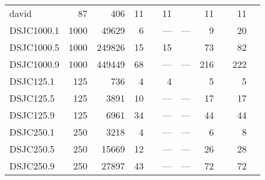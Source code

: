 \begin{table}[t]
\begin{tabular}{lrrrlrlrlrl}
  david & 87 & 406 & 11 & \cite{Malaguti2011} & 11 & \cite{Gualandi2012} & 11 & \cite{Mehrotra1996,Mehrotra1996,Malaguti2011,Gualandi2012,Mendez-Diaz2006} & 11 & \cite{Mehrotra1996,Mehrotra1996,Malaguti2011,Wu2013a,Gualandi2012,Mendez-Diaz2006,Brelaz1979,Sewell1996,Segundo2012} \\ 
  DSJC1000.1 & 1000 & 49629 & 6 & \cite{Held2011} & --- & --- & 9 & \cite{Held2011} & 20 & \cite{Galinier1999,BlochligerI.andZufferey2004,Hertz2008,Malaguti2008,Porumbel2010,Malaguti2011,Zhou2018,Galinier1999,Lu2010,Porumbel2010,Lu2010,Titiloye2011,Moalic2015,Wu2013a,Wu2012,Wu2013} \\ 
  DSJC1000.5 & 1000 & 249826 & 15 & \cite{Tomita2017} & 15 & \cite{Tomita2017} & 73 & \cite{Held2011} & 82 & \cite{Moalic2015} \\ 
  DSJC1000.9 & 1000 & 449449 & 68 & \cite{us} & --- & --- & 216 & \cite{Held2011} & 222 & \cite{Moalic2015,Titiloye2011,Wu2012} \\ 
  DSJC125.1 & 125 & 736 & 4 & \cite{Gualandi2012} & 4 & \cite{Gualandi2012} & 5 & \cite{Mendez-Diaz2006,Mendez-Diaz2006,Mendez-Diaz2008,Malaguti2011,Gualandi2012} & 5 & \cite{Zhou2016,Mendez-Diaz2006,Mendez-Diaz2006,Morgenstern1996,FunabikiNobuoandHigashino2000,Malaguti2011,Zhou2018,Wu2013a,Gualandi2012,Brelaz1979,Sewell1996,Segundo2012} \\ 
  DSJC125.5 & 125 & 3891 & 10 & \cite{us} & --- & --- & 17 & \cite{Malaguti2011} & 17 & \cite{Zhou2016,Morgenstern1996,FunabikiNobuoandHigashino2000,Malaguti2008,Malaguti2011,Zhou2018,Wu2013a,Gualandi2012} \\ 
  DSJC125.9 & 125 & 6961 & 34 & \cite{us} & --- & --- & 44 & \cite{Malaguti2011} & 44 & \cite{Zhou2016,Morgenstern1996,FunabikiNobuoandHigashino2000,Malaguti2008,Malaguti2011,Zhou2018,Wu2013a,Gualandi2012} \\ 
  DSJC250.1 & 250 & 3218 & 4 & \cite{Malaguti2011} & --- & --- & 6 & \cite{Malaguti2011} & 8 & \cite{Zhou2016,Morgenstern1996,FunabikiNobuoandHigashino2000,Malaguti2008,Malaguti2011,Zhou2018,Wu2013a} \\ 
  DSJC250.5 & 250 & 15669 & 12 & \cite{Held2011} & --- & --- & 26 & \cite{Held2011,Gualandi2012} & 28 & \cite{Morgenstern1996,Galinier1999,FunabikiNobuoandHigashino2000,Malaguti2008,Malaguti2011,Wu2013a} \\ 
  DSJC250.9 & 250 & 27897 & 43 & \cite{us} & --- & --- & 72 & \cite{Held2011} & 72 & \cite{Gualandi2012,Morgenstern1996,FunabikiNobuoandHigashino2000,Malaguti2008,Malaguti2011,Zhou2018,Wu2013a,Gualandi2012} \\ 

\end{tabular}
\end{table}
